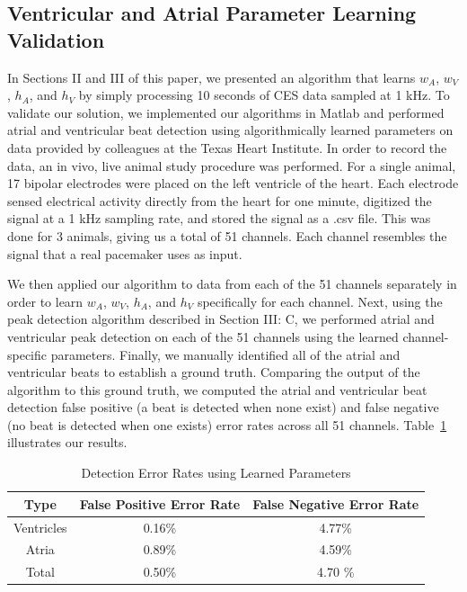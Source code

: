\documentclass[conference]{IEEEtran}
\newcommand{\APW}{\ensuremath{w_A}}
\newcommand{\VPW}{\ensuremath{w_V}}
\newcommand{\APH}{\ensuremath{h_A}}
\newcommand{\VPH}{\ensuremath{h_V}}
\begin{document}
\subsection{Ventricular and Atrial Parameter Learning Validation}
In Sections II and III of this paper, we presented an
algorithm that learns \APW{}, \VPW{}, \APH{}, and \VPH{} by
simply processing 10 seconds of CES data sampled at 1
kHz. To validate our solution, we implemented our algorithms in
Matlab and performed atrial and ventricular beat
detection using algorithmically learned parameters on
data provided by colleagues at the Texas Heart Institute.
In order to record the data, an in vivo,
live animal study procedure was performed. For a single
animal, 17 bipolar electrodes were placed on the left ventricle
of the heart. Each electrode sensed electrical activity
directly from the heart for one minute, digitized the
signal at a 1 kHz sampling rate, and stored the signal as
a .csv file. This was done for 3 animals, giving us a total
of 51 channels.
Each channel resembles the signal that a real pacemaker uses as input.

We then applied our algorithm to data
from each of the 51 channels separately in order to learn
\APW{}, \VPW{}, \APH{}, and \VPH{} specifically for each
channel. Next, using the peak detection algorithm
described in Section III: C, we performed atrial and
ventricular peak detection on each of the 51 channels
using the learned channel-specific parameters.
Finally, we manually identified all of the atrial and ventricular beats to establish a ground truth. 
Comparing the output of the algorithm to this ground truth, we computed the
atrial and ventricular beat detection 
false positive (a beat is detected when none
exist) and false negative (no beat is detected when one
exists) error rates across all 51 channels.
Table~\ref{tab:errors} illustrates our results.
\begin{table}[h]
	\caption{Detection Error Rates using Learned Parameters}
	\label{tab:errors}
	\centering
	\begin{tabular}{|c|c|c|}
		\hline
		Type & False Positive Error Rate & False Negative Error Rate \\
		\hline 
		Ventricles & 0.16\% &4.77\% \\
		\hline
		Atria & 0.89\% & 4.59\% \\
		\hline
		Total & 0.50\% & 4.70 \% \\
		\hline
	\end{tabular}
\end{table}
\end{document}
